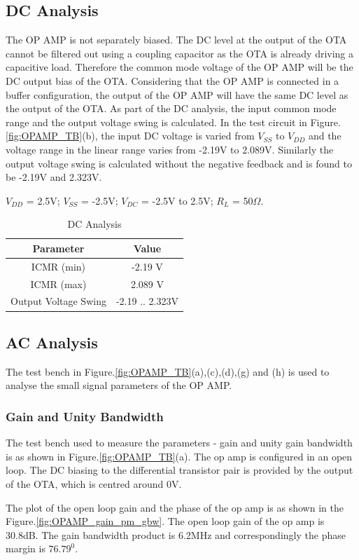 \subsection{DC Analysis}
The OP AMP is not separately biased. The DC level at the output of the OTA cannot be filtered out using a coupling capacitor as the OTA is already driving a capacitive load. Therefore the common mode voltage of the OP AMP will be the DC output bias of the OTA. Considering that the OP AMP is connected in a buffer configuration, the output of the OP AMP will have the same DC level as the output of the OTA. As part of the DC analysis, the input common mode range and the output voltage swing is calculated. In the test circuit in Figure.\ref{fig:OPAMP_TB}(b), the input DC voltage is varied from $V_{SS}$ to $V_{DD}$ and the voltage range in the linear range varies from -2.19V to 2.089V. Similarly the output voltage swing is calculated without the negative feedback and is found to be -2.19V and 2.323V.

$V_{DD}$ = 2.5V; $V_{SS}$ = -2.5V; $V_{DC}$ = -2.5V to 2.5V; $R_L$ = 50$\Omega$.
\begin{table} [H]
\centering
\begin{tabular}{@{}cc@{}}
\toprule
Parameter					& Value				\\ \midrule
ICMR (min)					& -2.19 V			\\
ICMR (max)					& 2.089 V			\\
Output Voltage Swing		& -2.19 .. 2.323V	\\
\bottomrule
\end{tabular}
\caption{DC Analysis}
\label{tab:OPAMP_DC}
\end{table}

\subsection{AC Analysis}
The test bench in Figure.\ref{fig:OPAMP_TB}(a),(c),(d),(g) and (h) is used to analyse the small signal parameters of the OP AMP.
\subsubsection{Gain and Unity Bandwidth}
The test bench used to measure the parameters - gain and unity gain bandwidth is as shown in Figure.\ref{fig:OPAMP_TB}(a). The op amp is configured in an open loop. The DC biasing to the differential transistor pair is provided by the output of the OTA, which is centred around 0V. 

The plot of the open loop gain and the phase of the op amp is as shown in the Figure.\ref{fig:OPAMP_gain_pm_gbw}. The open loop gain of the op amp is 30.8dB. The gain bandwidth product is 6.2MHz and correspondingly the phase margin is $76.79^0$.

